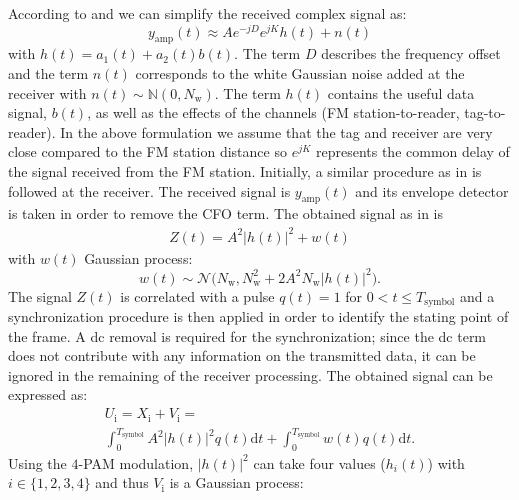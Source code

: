 \documentclass[journal]{IEEEtran}
\begin{document}
According  to \cite{daskalakis2017ambient} and \cite{qian2017noncoherent} we can simplify the  received complex signal as:
%
\begin{equation}
y_\text{amp}(t) \approx Ae^{-jD} e^{jK} h(t) + n(t)
\label{eq:y_t}
\end{equation}
%
with $h(t)= a_\text{1} (t)+a_\text{2}(t)b(t)$.  The term $D$ describes the frequency offset and the term $n(t)$ corresponds to the  white Gaussian noise added at the receiver with $n(t)\sim \mathbb{N}(0,N_\text{w})$. 
%
The term $h(t)$ contains  the useful data signal, $b(t)$, as well as the effects of the channels (FM station-to-reader, tag-to-reader).
%
In the above formulation we  assume that the tag and receiver are very close compared to the FM station distance so  $e^{jK}$ represents the common delay of the signal  received from the FM station. 
%
Initially, a  similar procedure as in \cite{daskalakis2017ambient}  is followed at the receiver. 
%
The received signal is $y_\text{amp}(t)$ and its envelope detector is taken in order to remove the CFO term.
The obtained signal as in \cite{daskalakis2017ambient} is  
%
\begin{equation}
\begin{gathered}
Z(t) = A^{2} \vert h(t)\vert ^2 + w(t)
\end{gathered}
\label{eq:zt}
\end{equation}
with $w(t)$ Gaussian process\cite{qian2017noncoherent}:
 \begin{equation}
w(t)\sim \mathcal{N} \big(N_\text{w},N_\text{w}^2+2A^2 N_\text{w} \vert h(t)\vert ^2 \big).
\label{eq:w}
\end{equation}
%
The signal $Z(t)$ is correlated with a pulse $q(t)=1$ for $0< t\leq T_\text{symbol}$ and a synchronization procedure is then applied  in order to identify the stating point of the frame.
%
A dc removal is required for the synchronization; since the dc term  does not
contribute with any information on the transmitted data, it can be ignored in the remaining of the receiver processing.
%
The obtained signal can be expressed as:
\begin{equation}
\begin{gathered}
U_\text{i} =X_\text{i} +V_\text{i} = \\
\int_0^{T_\text{symbol}}  A^2  |h(t)|^2 q(t) \mathrm{d}t +\int_0^{T_\text{symbol}}  w(t) q(t) \mathrm{d}t.
\end{gathered}
\label{eq:zt}
\end{equation}
%
Using the $4$-PAM modulation, $|h(t)|^2$ can take four values ($h_i(t)$) with $ i\in \lbrace 1, 2, 3, 4 \rbrace$ and thus $V_\text{i}$ is a  Gaussian process:  
\end{document}
